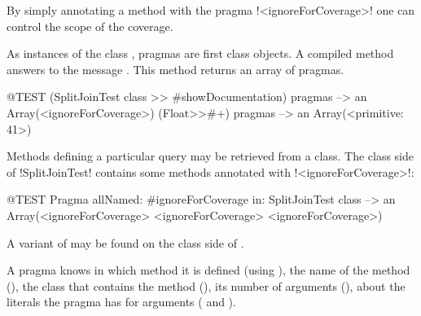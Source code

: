 \documentclass[a4paper,10pt,twoside]{book}
\begin{document}
By simply annotating a method with the pragma \ct!<ignoreForCoverage>! one can control the scope of the coverage.


%


As instances of the class , pragmas are first class objects. A compiled method answers to the message . This method returns an array of pragmas.

\begin{code}{@TEST}
(SplitJoinTest class >> #showDocumentation) pragmas
  --> an Array(<ignoreForCoverage>)
(Float>>#+) pragmas --> an Array(<primitive: 41>)
\end{code}

Methods defining a particular query may be retrieved from a class. The class side of \ct!SplitJoinTest! contains some methods annotated with \ct!<ignoreForCoverage>!:

\begin{code}{@TEST}
Pragma allNamed: #ignoreForCoverage in: SplitJoinTest class  --> an Array(<ignoreForCoverage> <ignoreForCoverage> <ignoreForCoverage>)
\end{code}

A variant of  may be found on the class side of .

A pragma knows in which method it is defined (using ), the name of the method (), the class that contains the method (), its number of arguments (), about the literals the pragma has for arguments ( and ).

\end{document}
